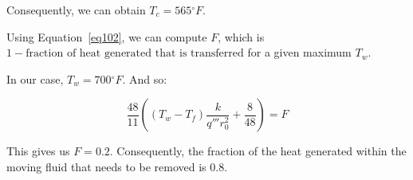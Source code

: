 Consequently, we can obtain $T_c = 565{}^\circ F$.

Using Equation~\ref{eq102}, we can compute $F$, which is $1 - \text{fraction of heat generated that is transferred}$ for a given maximum $T_w$.

In our case, $T_w = 700{}^\circ F$. And so:

\begin{equation}
\frac{48}{11} \left( (T_w - T_f) \frac{k}{q'''r_0^2} + \frac{8}{48} \right) = F 
\end{equation}

This gives us $F = 0.2$. Consequently, the fraction of the heat generated within the moving fluid that needs to be removed is $0.8$.
